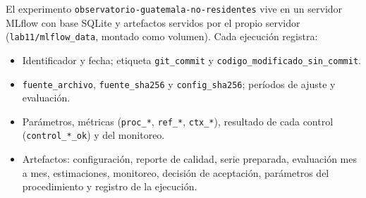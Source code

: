 \documentclass[11pt,letterpaper]{article}
\begin{document}
El experimento \texttt{observatorio-guatemala-no-residentes} vive en un servidor MLflow con base SQLite y artefactos servidos por el propio servidor (\texttt{lab11/mlflow\_data}, montado como volumen). Cada ejecución registra:

\begin{itemize}
\item Identificador y fecha; etiqueta \texttt{git\_commit} y \texttt{codigo\_modificado\_sin\_commit}.
\item \texttt{fuente\_archivo}, \texttt{fuente\_sha256} y \texttt{config\_sha256}; períodos de ajuste y evaluación.
\item Parámetros, métricas (\texttt{proc\_*}, \texttt{ref\_*}, \texttt{ctx\_*}), resultado de cada control (\texttt{control\_*\_ok}) y del monitoreo.
\item Artefactos: configuración, reporte de calidad, serie preparada, evaluación mes a mes, estimaciones, monitoreo, decisión de aceptación, parámetros del procedimiento y registro de la ejecución.
\end{itemize}
\end{document}
